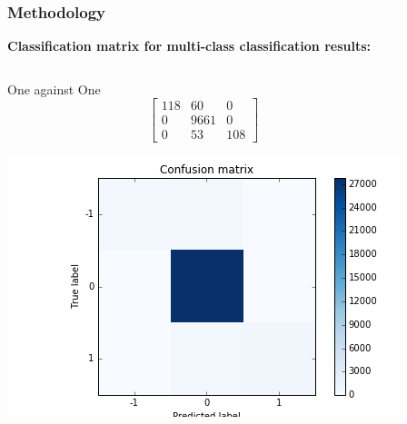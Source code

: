 \documentclass[xcolor={x11names,svgnames,dvipsnames}]{beamer}
\begin{document}
\begin{frame}
\frametitle{Methodology}
\textbf{Classification matrix for multi-class classification results:}\\
\begin{columns}
\column{2.3in}
	\begin{block}{One against One}
\begin{equation*}       
\left[           
  \begin{array}{ccc}   
    118&    60 &    0\\  
     0& 9661& 0\\  
    0  &  53 & 108
  \end{array}
\right]               
\end{equation*}
\begin{center}
     \includegraphics[width=1\textwidth, height=0.45\textheight]{one_vs_one.png}
\end{center}
\end{block}
\column{2.3in}


\end{columns}
\end{frame}
\end{document}
